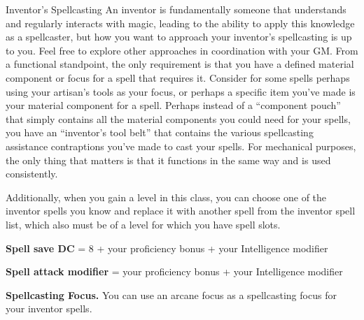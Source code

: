 \documentclass[11pt,twoside,openany]{book}  %
\begin{document}
\begin{CalloutBox}{Inventor's Spellcasting}
An inventor is fundamentally someone that understands and regularly interacts with magic, leading to the ability to apply this knowledge as a spellcaster, but how you want to approach your inventor’s spellcasting is up to you. Feel free to explore other approaches in coordination with your GM. From a functional standpoint, the only requirement is that you have a defined material component or focus for a spell that requires it.
Consider for some spells perhaps using your artisan’s tools as your focus, or perhaps a specific item you’ve made is your material component for a spell. Perhaps instead of a “component pouch” that simply contains all the material components you could need for your spells, you have an “inventor’s tool belt” that contains the various spellcasting assistance contraptions you’ve made to cast your spells. For mechanical purposes, the only thing that matters is that it functions in the same way and is used consistently.
\end{CalloutBox}
Additionally, when you gain a level in this class, you can choose one of the inventor spells you know and replace it with another spell from the inventor spell list, which also must be of a level for which you have spell slots.

\textbf{Spell save DC} = 8 + your proficiency bonus + your Intelligence modifier

\textbf{Spell attack modifier} = your proficiency bonus + your Intelligence modifier

\textbf{Spellcasting Focus.} You can use an arcane focus as a spellcasting focus for your inventor spells.
\end{document}
